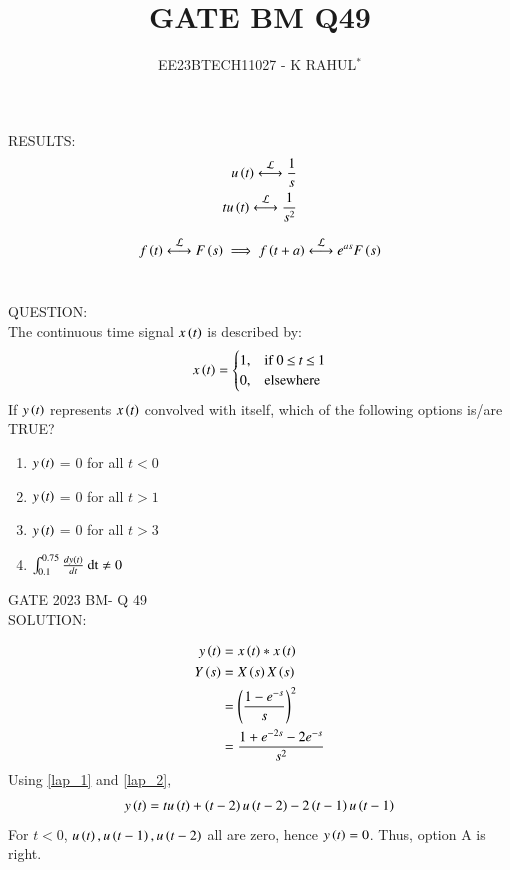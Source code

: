 \documentclass[journal,12pt,twocolumn]{IEEEtran}
\theoremstyle{remark}
\begin{document}

\vspace{3cm}
\title{GATE BM Q49}
\author{EE23BTECH11027 - K RAHUL$^{*}$%
}
\maketitle
\newpage
\bigskip
\renewcommand{\thefigure}{\theenumi}
\renewcommand{\thetable}{\theenumi}
RESULTS: \\
\begin{align}
u\brak{t} \system{L} \frac{1}{s}\\
tu\brak{t} \system{L} \frac{1}{s^2} \label{lap_1}
\end{align}
	
\begin{align}
    f\brak{t} \system{L} F\brak{s}  \implies f\brak{t+a} \system{L} e^{as}F\brak{s} \label{lap_2}
\end{align}\\
\bigskip

QUESTION:\\
The continuous time signal $x\left(t\right)$ is described by:
\begin{align}
x\left(t\right)=
    \begin{cases}
        1, & \text{if } 0\: {\displaystyle \leq }\:t\:{\displaystyle \leq }\:1\\
        0, & \text{elsewhere}
    \end{cases} 
\end{align}
If $y\left(t\right)$ represents $x\left(t\right)$ convolved with itself, which of the following options is/are TRUE?
\begin{enumerate}[label = \Alph*]
    \item $y\left(t\right)$ = 0 for all $t<0$\\
    \item $y\left(t\right)$ = 0 for all $t>1$\\
    \item $y\left(t\right)$ = 0 for all $t>3$\\
    \item $\int_{0.1}^{0.75} \frac{dy\left(t\right)}{dt}\: \text{dt} \neq 0$
\end{enumerate} \hfill{GATE 2023 BM- Q 49}\\
\bigskip 
\bigskip
SOLUTION:
\begin{table}[ht]

\end{table}
\bigskip
\begin{align}
    y\left(t\right) &= x\left(t\right) * x\left(t\right)\\
    Y\left(s\right) &= X\left(s\right)X\left(s\right)\\
    &=\left(\frac{1-e^{-s}}{s}\right)^2\\
    &=\frac{1+e^{-2s}-2e^{-s}}{s^2}
\end{align}
Using \eqref{lap_1} and \eqref{lap_2}, 
\begin{align}
    y\left(t\right) = tu\left(t\right) + \left(t-2\right)u\left(t-2\right) -2\left(t-1\right)u\left(t-1\right)
\end{align}
For $t<0$, $u\left(t\right), u\left(t-1\right), u\left(t-2\right)$ all are zero, hence $y\left(t\right) = 0$. Thus, option A is right.\\
\end{document}
